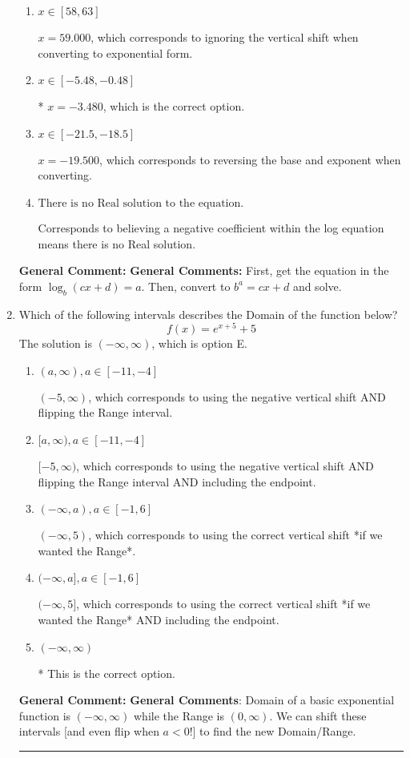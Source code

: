 \documentclass{extbook}[14pt]
\newcommand{\litem}[1]{\item #1

\rule{\textwidth}{0.4pt}}
\begin{document}
\begin{enumerate}
{\begin{enumerate}[label=\Alph*.]
$x = -12.500$, which corresponds to reversing the base and exponent when converting and reversing the value with $x$.
\item \( x \in [58, 63] \)

$x = 59.000$, which corresponds to ignoring the vertical shift when converting to exponential form.
\item \( x \in [-5.48, -0.48] \)

* $x = -3.480$, which is the correct option.
\item \( x \in [-21.5, -18.5] \)

$x = -19.500$, which corresponds to reversing the base and exponent when converting.
\item \( \text{There is no Real solution to the equation.} \)

Corresponds to believing a negative coefficient within the log equation means there is no Real solution.
\end{enumerate}

\textbf{General Comment:} \textbf{General Comments:} First, get the equation in the form $\log_b{(cx+d)} = a$. Then, convert to $b^a = cx+d$ and solve.
}
\litem{
Which of the following intervals describes the Domain of the function below?
\[ f(x) = e^{x+5}+5 \]The solution is \( (-\infty, \infty) \), which is option E.\begin{enumerate}[label=\Alph*.]
\item \( (a, \infty), a \in [-11, -4] \)

$(-5, \infty)$, which corresponds to using the negative vertical shift AND flipping the Range interval.
\item \( [a, \infty), a \in [-11, -4] \)

$[-5, \infty)$, which corresponds to using the negative vertical shift AND flipping the Range interval AND including the endpoint.
\item \( (-\infty, a), a \in [-1, 6] \)

$(-\infty, 5)$, which corresponds to using the correct vertical shift *if we wanted the Range*.
\item \( (-\infty, a], a \in [-1, 6] \)

$(-\infty, 5]$, which corresponds to using the correct vertical shift *if we wanted the Range* AND including the endpoint.
\item \( (-\infty, \infty) \)

* This is the correct option.
\end{enumerate}

\textbf{General Comment:} \textbf{General Comments}: Domain of a basic exponential function is $(-\infty, \infty)$ while the Range is $(0, \infty)$. We can shift these intervals [and even flip when $a<0$!] to find the new Domain/Range.
}
\end{enumerate}
\end{document}
